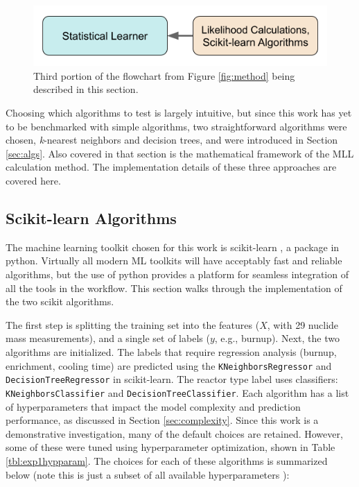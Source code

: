 
\begin{figure}[H]
  \centering
  \includegraphics[width=0.7\linewidth]{./chapters/exp1/methodology3.png}
  \caption{Third portion of the flowchart from Figure \ref{fig:method} being 
           described in this section.}
\end{figure}

Choosing which algorithms to test is largely intuitive, but since this work has
yet to be benchmarked with simple algorithms, two straightforward algorithms
were chosen, \textit{k}-nearest neighbors and decision trees, and were
introduced in Section \ref{sec:algs}. Also covered in that section is the
mathematical framework of the \gls{MLL} calculation method. The implementation
details of these three approaches are covered here. 

\subsection{Scikit-learn Algorithms}

The machine learning toolkit chosen for this work is scikit-learn
\cite{scikit}, a package in python.  Virtually all modern \gls{ML} toolkits
will have acceptably fast and reliable algorithms, but the use of python
provides a platform for seamless integration of all the tools in the workflow.
This section walks through the implementation of the two scikit algorithms. 


The first step is splitting the training set into the features ($X$, with 29
nuclide mass measurements), and a single set of labels ($y$, e.g., burnup).
Next, the two algorithms are initialized.  The labels that require regression
analysis (burnup, enrichment, cooling time) are predicted using the
\texttt{KNeighborsRegressor} and \texttt{DecisionTreeRegressor} in
scikit-learn. The reactor type label uses classifiers:
\texttt{KNeighborsClassifier} and \texttt{DecisionTreeClassifier}.  Each
algorithm has a list of hyperparameters that impact the model complexity and
prediction performance, as discussed in Section \ref{sec:complexity}. Since
this work is a demonstrative investigation, many of the default choices are
retained. However, some of these were tuned using hyperparameter optimization,
shown in Table \ref{tbl:exp1hypparam}.  The choices for each of these
algorithms is summarized below (note this is just a subset of all available
hyperparameters \cite{scikit}):

